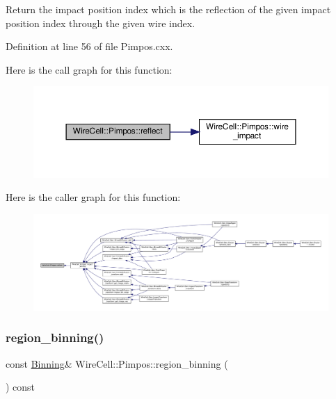 Return the impact position index which is the reflection of the given impact position index through the given wire index. 

Definition at line 56 of file Pimpos.\+cxx.

Here is the call graph for this function\+:
\nopagebreak
\begin{figure}[H]
\begin{center}
\leavevmode
\includegraphics[width=350pt]{class_wire_cell_1_1_pimpos_a712e8a7789b061dd96f1e21f15ecdc42_cgraph}
\end{center}
\end{figure}
Here is the caller graph for this function\+:
\nopagebreak
\begin{figure}[H]
\begin{center}
\leavevmode
\includegraphics[width=350pt]{class_wire_cell_1_1_pimpos_a712e8a7789b061dd96f1e21f15ecdc42_icgraph}
\end{center}
\end{figure}
\mbox{\label{class_wire_cell_1_1_pimpos_ac2d0a4ce2474237948537f0e4bd358f5}} 
\subsubsection{\texorpdfstring{region\+\_\+binning()}{region\_binning()}}
{\footnotesize\ttfamily const \hyperlink{class_wire_cell_1_1_binning}{Binning}\& Wire\+Cell\+::\+Pimpos\+::region\+\_\+binning (\begin{DoxyParamCaption}{ }\end{DoxyParamCaption}) const\hspace{0.3cm}{\ttfamily [inline]}}

